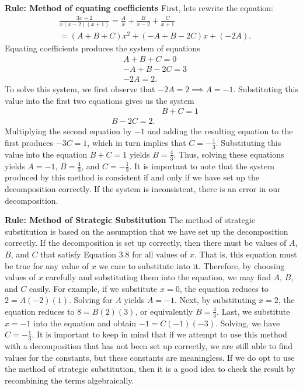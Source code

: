 \documentclass{report}
\begin{document}
    \pagebreak \bigbreak \noindent 
    \begin{mdframed}
    \textbf{Rule: Method of equating coefficients}
    \bigbreak \noindent 
    First, lets rewrite the equation:
    \begin{align*}
     &\frac{3x+2}{x(x-2)(x+1)} = \frac{A}{x} + \frac{B}{x-2} + \frac{C}{x+1} \\
     &=(A+B+C)x^{2}+(-A+B-2C)x+(-2A)
    .\end{align*}
    Equating coefficients produces the system of equations
    \begin{align*}
        &A+B+C=0 \\
        &-A+B-2C = 3 \\
        &-2A = 2
    .\end{align*}
    \bigbreak \noindent 
    To solve this system, we first observe that  $-2A=2\implies A=-1$. Substituting this value into the first two equations gives us the system
    \begin{align*}
        &&B+C=1 \\ 
        &B-2C = 2
    .\end{align*}
    \bigbreak \noindent 
    Multiplying the second equation by  $-1$ and adding the resulting equation to the first produces $-3C=1$,
    \bigbreak \noindent 
    which in turn implies that $C = -\frac{1}{3}$. Substituting this value into the equation $B+C=1$ yields $B=\frac{4}{3}$. Thus, solving these equations yields $A=-1$, $B=\frac{4}{3}$, and $C=-\frac{1}{3}$.
    \bigbreak \noindent 
    It is important to note that the system produced by this method is consistent if and only if we have set up the decomposition correctly. If the system is inconsistent, there is an error in our decomposition.
     \end{mdframed}
     \bigbreak \noindent 
     \begin{mdframed}
        \textbf{Rule: Method of Strategic Substitution} 
        \bigbreak \noindent 
        The method of strategic substitution is based on the assumption that we have set up the decomposition correctly. If the decomposition is set up correctly, then there must be values of $A$, $B$, and $C$ that satisfy Equation 3.8 for all values of $x$. That is, this equation must be true for any value of $x$ we care to substitute into it. Therefore, by choosing values of $x$ carefully and substituting them into the equation, we may find $A$, $B$, and $C$ easily. For example, if we substitute $x=0$, the equation reduces to $2=A(-2)(1)$. Solving for $A$ yields $A=-1$. Next, by substituting $x=2$, the equation reduces to $8=B(2)(3)$, or equivalently $B=\frac{4}{3}$. Last, we substitute $x=-1$ into the equation and obtain $-1=C(-1)(-3)$. Solving, we have $C=-\frac{1}{3}$.
        \bigbreak \noindent 
        It is important to keep in mind that if we attempt to use this method with a decomposition that has not been set up correctly, we are still able to find values for the constants, but these constants are meaningless. If we do opt to use the method of strategic substitution, then it is a good idea to check the result by recombining the terms algebraically.
     \end{mdframed}
\end{document}
